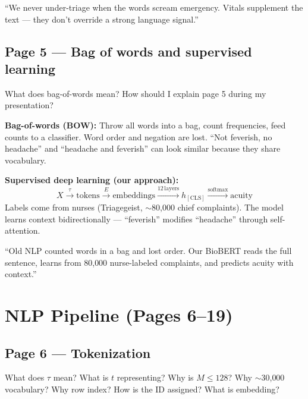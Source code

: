 \documentclass[11pt]{article}
\begin{document}
\begin{saybox}
``We never under-triage when the words scream emergency. Vitals supplement the text --- they don't override a strong language signal.''
\end{saybox}

\subsection{Page 5 --- Bag of words and supervised learning}

\begin{questionbox}
What does bag-of-words mean? How should I explain page 5 during my presentation?
\end{questionbox}

\begin{answerbox}
\textbf{Bag-of-words (BOW):} Throw all words into a bag, count frequencies, feed counts to a classifier. Word order and negation are lost. ``Not feverish, no headache'' and ``headache and feverish'' can look similar because they share vocabulary.

\textbf{Supervised deep learning (our approach):}
\[
X \xrightarrow{\tau} \text{tokens} \xrightarrow{E} \text{embeddings} \xrightarrow{12\,\text{layers}} h_{[\mathrm{CLS}]} \xrightarrow{\mathrm{softmax}} \text{acuity}
\]
Labels come from nurses (Triagegeist, $\sim$80{,}000 chief complaints). The model learns context bidirectionally --- ``feverish'' modifies ``headache'' through self-attention.
\end{answerbox}

\begin{saybox}
``Old NLP counted words in a bag and lost order. Our BioBERT reads the full sentence, learns from 80{,}000 nurse-labeled complaints, and predicts acuity with context.''
\end{saybox}

\section{NLP Pipeline (Pages 6--19)}

\subsection{Page 6 --- Tokenization}

\begin{questionbox}
What does $\tau$ mean? What is $t$ representing? Why is $M \leq 128$? Why $\sim$30{,}000 vocabulary? Why row index? How is the ID assigned? What is embedding?
\end{questionbox}
\end{document}
